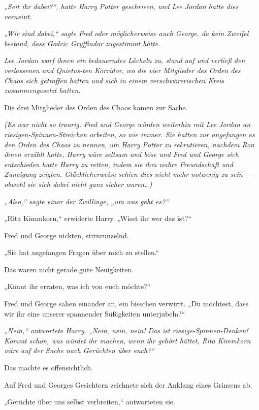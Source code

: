 {\emph{„Seit ihr dabei?“, hatte Harry Potter geschrieen, und Lee Jordan hatte dies verneint.}

\emph{„Wir sind dabei,“ sagte Fred oder möglicherweise auch George, da kein Zweifel bestand, dass Godric Gryffindor zugestimmt hätte.}

\emph{Lee Jordan warf ihnen ein bedauerndes Lächeln zu, stand auf und verließ den verlassenen und Quietus-ten Korridor, wo die vier Mitglieder des Orden des Chaos sich getroffen hatten und sich in einem verschwörerischen Kreis zusammengesetzt hatten.}

Die drei Mitglieder des Orden des Chaos kamen zur Sache.

\emph{(Es war nicht so traurig. Fred und George würden weiterhin mit Lee Jordan an riesigen-Spinnen-Streichen arbeiten, so wie immer. Sie hatten zur angefangen es den Orden des Chaos zu nennen, um Harry Potter zu rekrutieren, nachdem Ron ihnen erzählt hatte, Harry wäre seltsam und böse und Fred und George sich entschieden hatte Harry zu retten, indem sie ihm wahre Freundschaft und Zuneigung zeigten. Glücklicherweise schien dies nicht mehr notwenig zu sein ---- obwohl sie sich dabei nicht ganz sicher waren…)}

\emph{„Also,“ sagte einer der Zwillinge, „um was geht es?“}

„Rita Kimmkorn,“ erwiderte Harry. „Wisst ihr wer das ist?“

Fred und George nickten, stirnrunzelnd.

„Sie hat angefangen Fragen über mich zu stellen.“

Das waren nicht gerade gute Neuigkeiten.

„Könnt ihr erraten, was ich von euch möchte?“

Fred und George sahen einander an, ein bisschen verwirrt. „Du möchtest, dass wir ihr eine unserer spannender Süßigkeiten unterjubeln?“

\emph{„Nein,“ antwortete Harry. „Nein, nein, nein! Das ist riesige-Spinnen-Denken! Kommt schon, was würdet ihr machen, wenn ihr gehört hättet, Rita Kimmkorn wäre auf der Suche nach Gerüchten über euch?“}

Das machte es offensichtlich.

Auf Fred und Georges Gesichtern zeichnete sich der Anklang eines Grinsens ab.

„Gerüchte über uns selbst verbreiten,“ antworteten sie.

}
